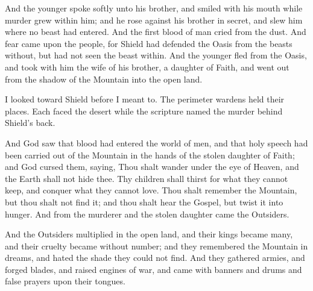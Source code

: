 \begin{scripture}
And the younger spoke softly unto his brother, and smiled with his mouth while murder grew within him; and he rose against his brother in secret, and slew him where no beast had entered. And the first blood of man cried from the dust. And fear came upon the people, for Shield had defended the Oasis from the beasts without, but had not seen the beast within. And the younger fled from the Oasis, and took with him the wife of his brother, a daughter of Faith, and went out from the shadow of the Mountain into the open land.
\end{scripture}

I looked toward Shield before I meant to. The perimeter wardens held their places. Each faced the desert while the scripture named the murder behind Shield's back.\par

\begin{scripture}
And God saw that blood had entered the world of men, and that holy speech had been carried out of the Mountain in the hands of the stolen daughter of Faith; and God cursed them, saying, Thou shalt wander under the eye of Heaven, and the Earth shall not hide thee. Thy children shall thirst for what they cannot keep, and conquer what they cannot love. Thou shalt remember the Mountain, but thou shalt not find it; and thou shalt hear the Gospel, but twist it into hunger. And from the murderer and the stolen daughter came the Outsiders.
\end{scripture}

\begin{scripture}
And the Outsiders multiplied in the open land, and their kings became many, and their cruelty became without number; and they remembered the Mountain in dreams, and hated the shade they could not find. And they gathered armies, and forged blades, and raised engines of war, and came with banners and drums and false prayers upon their tongues.
\end{scripture}

